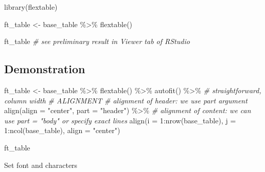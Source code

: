 \documentclass[
]{book}
\newenvironment{Shaded}{\begin{snugshade}}{\end{snugshade}}
\newcommand{\AttributeTok}[1]{\textcolor[rgb]{0.77,0.63,0.00}{#1}}
\newcommand{\CommentTok}[1]{\textcolor[rgb]{0.56,0.35,0.01}{\textit{#1}}}
\newcommand{\DecValTok}[1]{\textcolor[rgb]{0.00,0.00,0.81}{#1}}
\newcommand{\FunctionTok}[1]{\textcolor[rgb]{0.00,0.00,0.00}{#1}}
\newcommand{\NormalTok}[1]{#1}
\newcommand{\OtherTok}[1]{\textcolor[rgb]{0.56,0.35,0.01}{#1}}
\newcommand{\SpecialCharTok}[1]{\textcolor[rgb]{0.00,0.00,0.00}{#1}}
\newcommand{\StringTok}[1]{\textcolor[rgb]{0.31,0.60,0.02}{#1}}
\begin{document}
\begin{Shaded}
\begin{Highlighting}[]
\FunctionTok{library}\NormalTok{(flextable)}

\NormalTok{ft\_table }\OtherTok{\textless{}{-}}\NormalTok{ base\_table }\SpecialCharTok{\%\textgreater{}\%}
  \FunctionTok{flextable}\NormalTok{()}

\NormalTok{ft\_table }\CommentTok{\# see preliminary result in Viewer tab of RStudio}
\end{Highlighting}
\end{Shaded}

\hypertarget{demonstration}{%
\subsection{Demonstration}\label{demonstration}}

\begin{Shaded}
\begin{Highlighting}[]
\NormalTok{ft\_table }\OtherTok{\textless{}{-}}\NormalTok{ base\_table }\SpecialCharTok{\%\textgreater{}\%}
  \FunctionTok{flextable}\NormalTok{() }\SpecialCharTok{\%\textgreater{}\%}
  \FunctionTok{autofit}\NormalTok{() }\SpecialCharTok{\%\textgreater{}\%} \CommentTok{\# straightforward, column width}
  \CommentTok{\# ALIGNMENT}
  \CommentTok{\# alignment of header: we use part argument}
  \FunctionTok{align}\NormalTok{(}\AttributeTok{align =} \StringTok{"center"}\NormalTok{, }\AttributeTok{part =} \StringTok{"header"}\NormalTok{) }\SpecialCharTok{\%\textgreater{}\%}
  \CommentTok{\# alignment of content: we can use part = "body" or specify exact lines }
  \FunctionTok{align}\NormalTok{(}\AttributeTok{i =} \DecValTok{1}\SpecialCharTok{:}\FunctionTok{nrow}\NormalTok{(base\_table), }\AttributeTok{j =} \DecValTok{1}\SpecialCharTok{:}\FunctionTok{ncol}\NormalTok{(base\_table), }\AttributeTok{align =} \StringTok{"center"}\NormalTok{) }

\NormalTok{ft\_table}
\end{Highlighting}
\end{Shaded}

Set font and characters
\end{document}
